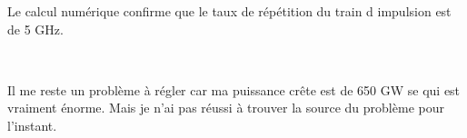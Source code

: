 \documentclass[a4paper,12pt,titlepage]{article}
\begin{document}
        Le calcul numérique confirme que le taux de répétition du train d impulsion est de  5 GHz.
        
        ~
        
        Il me reste un problème à régler car ma puissance crête est de 650 GW se qui est vraiment énorme. Mais je n'ai pas réussi à trouver la source du problème pour l'instant.
        
\end{document}
